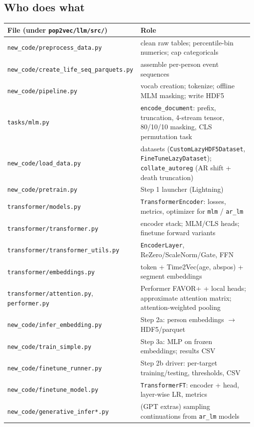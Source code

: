 \documentclass[11pt,a4paper]{article}
\newcommand{\code}[1]{\texttt{\small #1}}
\begin{document}
\subsection{Who does what}
\begin{center}\small
\begin{tabular}{@{}lp{9.2cm}@{}}
\toprule
\textbf{File (under \code{pop2vec/llm/src/})} & \textbf{Role} \\
\midrule
\code{new\_code/preprocess\_data.py}    & clean raw tables; percentile-bin numerics; cap categoricals \\
\code{new\_code/create\_life\_seq\_parquets.py} & assemble per-person event sequences \\
\code{new\_code/pipeline.py}            & vocab creation; tokenize; offline MLM masking; write HDF5 \\
\code{tasks/mlm.py}                     & \code{encode\_document}: prefix, truncation, 4-stream tensor, 80/10/10 masking, CLS permutation task \\
\code{new\_code/load\_data.py}          & datasets (\code{CustomLazyHDF5Dataset}, \code{FineTuneLazyDataset}); \code{collate\_autoreg} (AR shift + death truncation) \\
\code{new\_code/pretrain.py}            & Step 1 launcher (Lightning) \\
\code{transformer/models.py}            & \code{TransformerEncoder}: losses, metrics, optimizer for \code{mlm} / \code{ar\_lm} \\
\code{transformer/transformer.py}       & encoder stack; MLM/CLS heads; finetune forward variants \\
\code{transformer/transformer\_utils.py}& \code{EncoderLayer}, ReZero/ScaleNorm/Gate, FFN \\
\code{transformer/embeddings.py}        & token + Time2Vec(age, abspos) + segment embeddings \\
\code{transformer/attention.py}, \code{performer.py} & Performer FAVOR+ + local heads; approximate attention matrix; attention-weighted pooling \\
\code{new\_code/infer\_embedding.py}    & Step 2a: person embeddings $\to$ HDF5/parquet \\
\code{new\_code/train\_simple.py}       & Step 3a: MLP on frozen embeddings; results CSV \\
\code{new\_code/finetune\_runner.py}    & Step 2b driver: per-target training/testing, thresholds, CSV \\
\code{new\_code/finetune\_model.py}     & \code{TransformerFT}: encoder + head, layer-wise LR, metrics \\
\code{new\_code/generative\_infer*.py}  & (GPT extras) sampling continuations from \code{ar\_lm} models \\
\bottomrule
\end{tabular}
\end{center}
\end{document}
